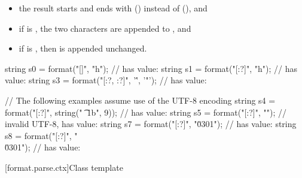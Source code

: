 \begin{itemize}
\item
the result starts and ends with  ()
instead of  (), and
\item
if  is ,
the two characters  are appended to , and
\item
if  is ,
then  is appended unchanged.
\end{itemize}

\begin{example}
\begin{codeblock}
string s0 = format("[{}]", "h\tllo");               //  has value: \tcode{[h    llo]}
string s1 = format("[{:?}]", "h\tllo");             //  has value: 
string s3 = format("[{:?}, {:?}]", '\'', '"');      //  has value: \tcode{['\textbackslash '', '"']}

// The following examples assume use of the UTF-8 encoding
string s4 = format("[{:?}]", string("\0 \n \t {} \x1b", 9));
                                                    //  has value: 
string s5 = format("[{:?}]", "");           // invalid UTF-8,  has value: \tcode{["\textbackslash x\{c3\}("]}
string s7 = format("[{:?}]", "\u0301");             //  has value: \tcode{["\textbackslash u{301}"]}
string s8 = format("[{:?}]", "\\\u0301");           //  has value: 
\end{codeblock}
\end{example}

[format.parse.ctx]{Class template }

